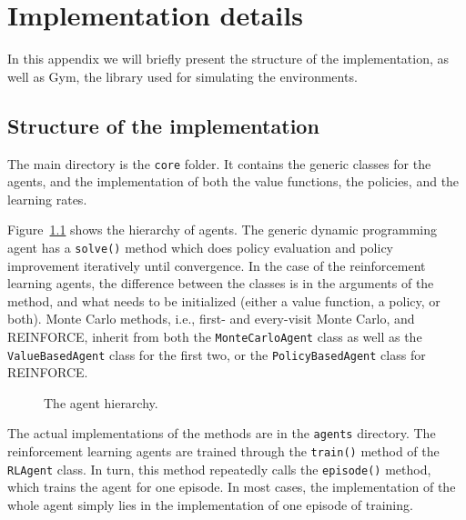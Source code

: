 \chapter{Implementation details}
In this appendix we will briefly present the structure of the implementation, as well as Gym, the library used for simulating the environments.

\section{Structure of the implementation}
The main directory is the \texttt{core} folder. It contains the generic classes for the agents, and the implementation of both the value functions, the policies, and the learning rates.

Figure~\ref{fig:agent_hierarchy} shows the hierarchy of agents. The generic dynamic programming agent has a \texttt{solve()} method which does policy evaluation and policy improvement iteratively until convergence. In the case of the reinforcement learning agents, the difference between the classes is in the arguments of the method, and what needs to be initialized (either a value function, a policy, or both). Monte Carlo methods, i.e., first- and every-visit Monte Carlo, and REINFORCE, inherit from both the \texttt{MonteCarloAgent} class as well as the \texttt{ValueBasedAgent} class for the first two, or the \texttt{PolicyBasedAgent} class for REINFORCE.
\begin{figure}
\centering
{}
\caption{The agent hierarchy.}
\label{fig:agent_hierarchy}
\end{figure}

The actual implementations of the methods are in the \texttt{agents} directory. The reinforcement learning agents are trained through the \texttt{train()} method of the \texttt{RLAgent} class. In turn, this method repeatedly calls the \texttt{episode()} method, which trains the agent for one episode. In most cases, the implementation of the whole agent simply lies in the implementation of one episode of training.

